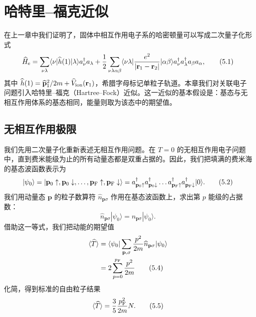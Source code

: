 \chapter{哈特里–福克近似}

在上一章中我们证明了，固体中相互作用电子系的哈密顿量可以写成二次量子化形式
\begin{equation*}
\widehat{H}_{\rm e}=\sum_{\nu\lambda}\langle\nu|\widehat{h}(1)|\lambda\rangle a_\nu^\dagger a_\lambda+\frac{1}{2}\sum_{\nu\lambda\alpha\beta}\langle\nu\lambda|\frac{e^2}{|\mathbf{r}_1-\mathbf{r}_2|}|\alpha\beta\rangle a_\nu^\dagger a_\lambda^\dagger a_\beta a_\alpha,
\tag{5.1}
\end{equation*}
其中 $\widehat{h}(1)=\widehat{\mathbf{p}}_1^2/2m+\widehat{V}_{\rm ion}(\mathbf{r}_1)$，希腊字母标记单粒子轨道。本章我们对关联电子问题引入哈特里–福克（Hartree--Fock）近似。这一近似的基本假设是：基态与无相互作用体系的基态相同，能量则取为该态中的期望值。

\section{无相互作用极限}

我们先用二次量子化重新表述无相互作用问题。在 $T=0$ 的无相互作用电子问题中，直到费米能级为止的所有动量态都是双重占据的。因此，我们把填满的费米海的基态波函数表示为
\begin{equation*}
|\psi_0\rangle=|\mathbf{p}_0\uparrow,\mathbf{p}_0\downarrow,\ldots,\mathbf{p}_{\rm F}\uparrow,\mathbf{p}_{\rm F}\downarrow\rangle=a_{\mathbf{p}_0\uparrow}^\dagger a_{\mathbf{p}_0\downarrow}^\dagger\ldots a_{\mathbf{p}_{\rm F}\uparrow}^\dagger a_{\mathbf{p}_{\rm F}\downarrow}^\dagger|0\rangle.
\tag{5.2}
\end{equation*}
我们用动量态 $\mathbf{p}$ 的粒子数算符 $\widehat{n}_{\mathbf{p}\sigma}$ 作用在基态波函数上，求出第 $p$ 能级的占据数：
\begin{equation*}
\widehat{n}_{\mathbf{p}\sigma}|\psi_0\rangle=n_{\mathbf{p}\sigma}|\psi_0\rangle.
\tag{5.3}
\end{equation*}
借助这一等式，我们把动能的期望值
\begin{align*}
\langle\widehat{T}\rangle&=\langle\psi_0|\sum_{\mathbf{p},\sigma}\frac{p^2}{2m}\widehat{n}_{\mathbf{p}\sigma}|\psi_0\rangle\\
&=2\sum_{p=0}^{p_{\rm F}}\frac{p^2}{2m}
\tag{5.4}
\end{align*}
化简，得到标准的自由粒子结果
\begin{equation*}
\langle\widehat{T}\rangle=\frac{3}{5}\frac{p_{\rm F}^2}{2m}N.
\tag{5.5}
\end{equation*}

